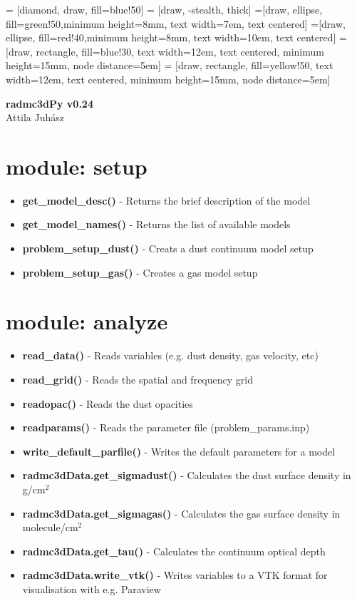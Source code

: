 \documentclass[12pt]{article}
\begin{document}
 = [diamond, draw, fill=blue!50]
 = [draw, -stealth, thick]
=[draw, ellipse, fill=green!50,minimum height=8mm, text width=7em, text centered]
=[draw, ellipse, fill=red!40,minimum height=8mm, text width=10em, text centered]
 = [draw, rectangle, fill=blue!30, text width=12em, text centered, minimum height=15mm, node distance=5em]
 = [draw, rectangle, fill=yellow!50, text width=12em, text centered, minimum height=15mm, node distance=5em]



\begin{center}
{\huge\bf radmc3dPy v0.24}\\
\vspace{0.5cm}
{\large Attila Juh\'asz}
\end{center}

\section*{module: setup}
\begin{itemize}
\item[] {\bf get\_model\_desc()} - Returns the brief description of the model
\item[] {\bf get\_model\_names()} - Returns the list of available models
\item[] {\bf problem\_setup\_dust()} - Creats a dust continuum model setup
\item[] {\bf problem\_setup\_gas()} - Creates a gas model setup
\end{itemize}

\section*{module: analyze}
\begin{itemize}
\item[]{\bf read\_data()} - Reads variables (e.g. dust density, gas velocity, etc)
\item[]{\bf read\_grid()} - Reads the spatial and frequency grid
\item[]{\bf readopac()} - Reads the dust opacities
\item[]{\bf readparams()} - Reads the parameter file (problem\_params.inp)
\item[]{\bf write\_default\_parfile()} - Writes the default parameters for a model
\item[]{\bf radmc3dData.get\_sigmadust()} - Calculates the dust surface density in g/cm$^2$
\item[]{\bf radmc3dData.get\_sigmagas()} - Calculates the gas surface density in molecule/cm$^2$
\item[]{\bf radmc3dData.get\_tau()} - Calculates the continuum optical depth 
\item[]{\bf radmc3dData.write\_vtk()} - Writes variables to a VTK format for visualisation with e.g. Paraview 
\end{itemize}
\end{document}
